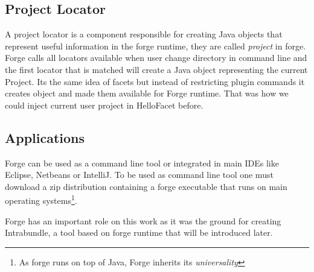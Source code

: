 \subsection{Project Locator}
\label{sec:forge:locator}
 A project locator is a component responsible for creating Java objects that represent useful information in the forge runtime, they are called \emph{project} in forge. Forge calls all locators available when user change directory in command line and the first locator that is matched will create a Java object representing the current Project. Its the same idea of facets but instead of restricting plugin commands it creates object and made them available for Forge runtime. That was how we could inject current user project in HelloFacet before.

\subsection{Applications}
Forge can be used as a command line tool or integrated in main IDEs like Eclipse, Netbeans or IntelliJ. To be used as command line tool one must download a zip distribution containing a forge executable that runs on main operating systems\footnote{As forge runs on top of Java, Forge inherits its \emph{universality}}.    

Forge has an important role on this work as it was the ground for creating Intrabundle, a tool based on forge runtime that will be introduced later.
